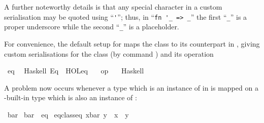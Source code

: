 \begin{isabellebody}
\begin{isamarkuptext}
  A further noteworthy details is that any special
  character in a custom serialisation may be quoted
  using ``\verb|'|''; thus, in
  ``\verb|fn '_ => _|'' the first
  ``\verb|_|'' is a proper underscore while the
  second ``\verb|_|'' is a placeholder.%
\end{isamarkuptext}%
\isamarkuptrue%
%
\isamarkuptrue%
%
\begin{isamarkuptext}%
For convenience, the default
   setup for  maps the  class to
  its counterpart in , giving custom serialisations
  for the class  (by command \hyperlink{command.code-class}{\mbox{}}) and its operation
\end{isamarkuptext}%
\isamarkuptrue%
%
\isadelimquotett
%
\endisadelimquotett
%
\isatagquotett
{}\isamarkupfalse%
\ eq\isanewline
\ \ {\isacharparenleft}Haskell\ {\isachardoublequoteopen}Eq{\isachardoublequoteclose}\ \ {\isachardoublequoteopen}HOL{\isachardot}eq{\isachardoublequoteclose}\ {\isasymequiv}\ {\isachardoublequoteopen}{\isacharparenleft}{\isacharequal}{\isacharequal}{\isacharparenright}{\isachardoublequoteclose}{\isacharparenright}\isanewline
\isanewline
{}\isamarkupfalse%
\ {\isachardoublequoteopen}op\ {\isacharequal}{\isachardoublequoteclose}\isanewline
\ \ {\isacharparenleft}Haskell\ \ {}\ {\isachardoublequoteopen}{\isacharequal}{\isacharequal}{\isachardoublequoteclose}{\isacharparenright}%
\endisatagquotett
{\isafoldquotett}%
%
\isadelimquotett
%
\endisadelimquotett
%
\begin{isamarkuptext}%
\noindent A problem now occurs whenever a type which
  is an instance of  in  is mapped
  on a -built-in type which is also an instance
  of  :%
\end{isamarkuptext}%
\isamarkuptrue%
%
\isadelimquote
%
\endisadelimquote
%
\isatagquote
{}\isamarkupfalse%
\ bar\isanewline
\isanewline
{}\isamarkupfalse%
\ bar\ {\isacharcolon}{\isacharcolon}\ eq\isanewline
{}\isanewline
\isanewline
{}\isamarkupfalse%
\ {\isachardoublequoteopen}eq{\isacharunderscore}class{\isachardot}eq\ {\isacharparenleft}x{\isasymColon}bar{\isacharparenright}\ y\ {\isasymlongleftrightarrow}\ x\ {\isacharequal}\ y{\isachardoublequoteclose}\isanewline

\end{isabellebody}
